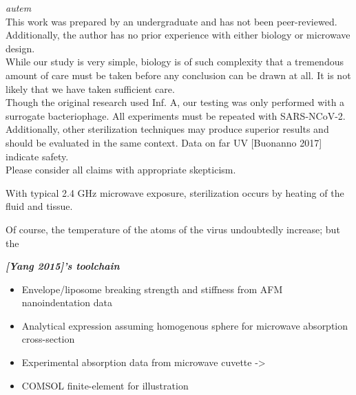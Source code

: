 \documentclass[fleqn,10pt]{article}
\begin{document}
\begin{autem}
	{\large  \it autem} \\
	
	This work was prepared by an undergraduate and has not been peer-reviewed. Additionally, the author has no prior experience with either biology or microwave design. \\

	While our study is very simple, biology is of such complexity that a tremendous amount of care must be taken before any conclusion can be drawn at all. It is not likely that we have taken sufficient care.\\ 

	Though the original research used Inf. A, our testing was only performed with a surrogate bacteriophage. All experiments must be repeated with SARS-NCoV-2. \\

	Additionally, other sterilization techniques may produce superior results and should be evaluated in the same context. Data on far UV [Buonanno 2017] indicate safety.\\

	Please consider all claims with appropriate skepticism.

\end{autem}
	

\begin{multicols}{1}


With typical 2.4 GHz microwave exposure, sterilization occurs by heating of the fluid and tissue.

Of course, the temperature of the atoms of the virus undoubtedly increase; but the 

\begin{toolchain}
	{\it \bf [Yang 2015]'s toolchain}
	\begin{itemize}
	\item Envelope/liposome breaking strength and stiffness from AFM nanoindentation data
	\item Analytical expression assuming homogenous sphere for microwave absorption cross-section
	\item Experimental absorption data from microwave cuvette -> 
	\item COMSOL finite-element for illustration
	\end{itemize}
\end{toolchain}

\end{multicols}
\end{document}
